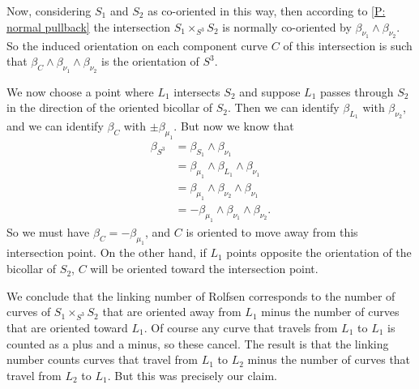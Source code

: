 Now, considering $S_1$ and $S_2$ as co-oriented in this way, then according to \cref{P: normal pullback} the intersection $S_1 \times_{S^3} S_2$ is normally co-oriented by $\beta_{\nu_1} \wedge \beta_{\nu_2}$.
So the induced orientation on each component curve $C$ of this intersection is such that $\beta_C \wedge \beta_{\nu_1} \wedge \beta_{\nu_2}$ is the orientation of $S^3$.


We now choose a point where $L_1$ intersects $S_2$ and suppose $L_1$ passes through $S_2$ in the direction of the oriented bicollar of $S_2$.
Then we can identify $\beta_{L_1}$ with $\beta_{\nu_2}$, and we can identify $\beta_{C}$ with $\pm\beta_{\mu_1}$.
But now we know that
\begin{align*}
	\beta_{S^3} &= \beta_{S_1} \wedge \beta_{\nu_1}\\
				&= \beta_{\mu_1} \wedge \beta_{L_1} \wedge \beta_{\nu_1}\\
				&= \beta_{\mu_1} \wedge \beta_{\nu_2} \wedge \beta_{\nu_1}\\
				&= -\beta_{\mu_1} \wedge \beta_{\nu_1} \wedge  \beta_{\nu_2}.
\end{align*}
So we must have $\beta_C = -\beta_{\mu_1}$, and $C$ is oriented to move away from this intersection point.
On the other hand, if $L_1$ points opposite the orientation of the bicollar of $S_2$, $C$ will be oriented toward the intersection point.

We conclude that the linking number of Rolfsen corresponds to the number of curves of $S_1 \times_{S^3} S_2$ that are oriented away from $L_1$ minus the number of curves that are oriented toward $L_1$.
Of course any curve that travels from $L_1$ to $L_1$ is counted as a plus and a minus, so these cancel.
The result is that the linking number counts curves that travel from $L_1$ to $L_2$ minus the number of curves that travel from $L_2$ to $L_1$.
But this was precisely our claim.

